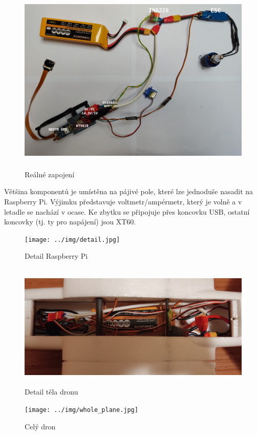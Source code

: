 \documentclass[a4paper,oneside,12pt]{report}
\begin{document}
\begin{figure}[h]
  \centering
  \includegraphics[height=9cm]{../img/circuit.jpg}
  \caption[Reálné zapojení]{Reálné zapojení}
\end{figure}

Většina komponentů je umístěna na pájivé pole, které lze jednoduše nasadit na Raspberry Pi.
Výjimku představuje voltmetr/ampérmetr, který je volně a v letadle se nachází v ocase.
Ke zbytku se připojuje přes koncovku USB, ostatní koncovky (tj. ty pro napájení) jsou XT60.

\begin{figure}[h]
  \centering
  \texttt{[image: ../img/detail.jpg]}
  \caption[Detail Raspberry Pi]{Detail Raspberry Pi}
\end{figure}


\newpage

\begin{figure}[h]
  \centering
  \includegraphics[height=6cm]{../img/body.jpg}
  \caption[Detail těla dronu]{Detail těla dronu}
\end{figure}

\begin{figure}[h]
  \centering
  \texttt{[image: ../img/whole\_plane.jpg]}
  \caption[Celý dron]{Celý dron}
\end{figure}
\end{document}

